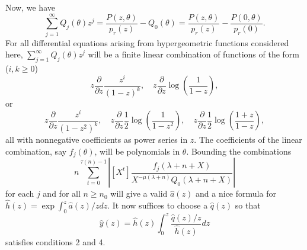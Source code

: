 \documentclass[10pt]{article}
\begin{document}
Now, we have
\begin{equation*}
\sum_{j=1}^{\infty} Q_j(\theta) z^j = \frac{P(z,\theta)}{p_r(z)} - Q_0(\theta)
= \frac{P(z,\theta)}{p_r(z)} - \frac{P(0,\theta)}{p_r(0)} \text{.}
\end{equation*}
For all differential equations arising from hypergeometric functions considered here, $\sum_{j=1}^{\infty} Q_j(\theta) z^j$ will be a finite linear combination of functions of the form ($i, k \ge 0$)
\begin{equation*}
z \frac{\partial}{\partial z} \frac{z^i}{(1-z)^k}, \quad
z \frac{\partial}{\partial z} \log \left( \frac{1}{1-z} \right), \end{equation*}
or
\begin{equation*}
z \frac{\partial}{\partial z} \frac{z^i}{(1-z^2)^k}, \quad
z \frac{\partial}{\partial z} \frac{1}{2} \log \left( \frac{1}{1-z^2} \right), \quad
z \frac{\partial}{\partial z} \frac{1}{2}\log \left( \frac{1+z}{1-z} \right),
\end{equation*}
all with nonnegative coefficients as power series in $z$. The coefficients of the linear combination, say $f_j(\theta)$, will be polynomials in $\theta$. Bounding the combinations
\begin{equation*}
n \sum_{t=0}^{\tau(n) - 1} \left| [X^t] \frac{f_j(\lambda+n+X)}{X^{-\mu(\lambda+n)} Q_0(\lambda+n+X)} \right|
\end{equation*}
for each $j$ and for all $n \ge n_0$ will give a valid $\hat{a}(z)$ and a nice formula for $\hat{h}(z) = \exp \int_0^z \hat{a}(z)/z dz$. It now suffices to choose a $\hat{q}(z)$ so that
\begin{equation*}
\hat{y}(z)=\hat{h}(z) \int_0^z \frac{\hat{q}(z)/z}{\hat{h}(z)}{dz}
\end{equation*}
satisfies conditions 2 and 4.
\end{document}
